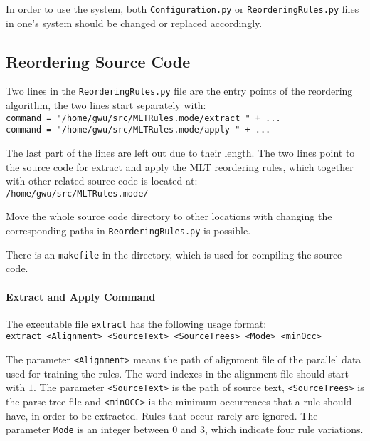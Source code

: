 In order to use the system, both \verb|Configuration.py| or \verb|ReorderingRules.py| files in one's system should be changed or replaced accordingly.

\subsection{Reordering Source Code}

Two lines in the \verb|ReorderingRules.py| file are the entry points of the reordering algorithm, the two lines start separately with:\\
\verb|command = "/home/gwu/src/MLTRules.mode/extract " + ...|\\
\verb|command = "/home/gwu/src/MLTRules.mode/apply " + ...|

The last part of the lines are left out due to their length. The two lines point to the source code for extract and apply the MLT reordering rules, which together with other related source code is located at:\\
\verb|/home/gwu/src/MLTRules.mode/|

Move the whole source code directory to other locations with changing the corresponding paths in \verb|ReorderingRules.py| is possible.

There is an \verb|makefile| in the directory, which is used for compiling the source code.

\paragraph{Extract and Apply Command}

The executable file \verb|extract| has the following usage format:\\ \verb|extract <Alignment> <SourceText> <SourceTrees> <Mode> <minOcc>|

The parameter \verb|<Alignment>| means the path of alignment file of the parallel data used for training the rules. The word indexes in the alignment file should start with $1$. The parameter \verb|<SourceText>| is the path of source text, \verb|<SourceTrees>| is the parse tree file and \verb|<minOCC>| is the minimum occurrences that a rule should have, in order to be extracted. Rules that occur rarely are ignored. The parameter \verb|Mode| is an integer between $0$ and $3$, which indicate four rule variations.

